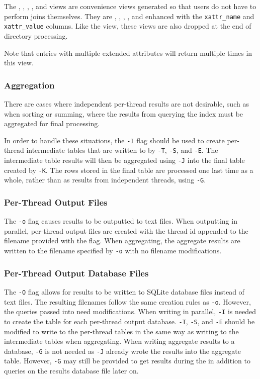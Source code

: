 The \xentries, \xpentries, \xsummary, \vrxpentries, and \vrxsummary
views are convenience views generated so that users do not have to
perform joins themselves. They are \entries, \pentries, \summary,
\vrpentries, and \vrsummary enhanced with the \texttt{xattr\_name} and
\texttt{xattr\_value} columns. Like the \xattrs view, these views are
also dropped at the end of directory processing.

Note that entries with multiple extended attributes will return
multiple times in this view.

\subsubsection{Aggregation}
There are cases where independent per-thread results are not
desirable, such as when sorting or summing, where the results from
querying the index must be aggregated for final processing.

In order to handle these situations, the \texttt{-I} flag should be
used to create per-thread intermediate tables that are written to by
\texttt{-T}, \texttt{-S}, and \texttt{-E}. The intermediate table
results will then be aggregated using \texttt{-J} into the final table
created by \texttt{-K}. The rows stored in the final table are
processed one last time as a whole, rather than as results from
independent threads, using \texttt{-G}.

\subsubsection{Per-Thread Output Files}
The \texttt{-o} flag causes results to be outputted to text
files. When outputting in parallel, per-thread output files are
created with the thread id appended to the filename provided with the
flag. When aggregating, the aggregate results are written to the
filename specified by \texttt{-o} with no filename modifications.

\subsubsection{Per-Thread Output Database Files}
The \texttt{-O} flag allows for results to be written to SQLite
database files instead of text files. The resulting filenames follow
the same creation rules as \texttt{-o}. However, the queries passed
into \gufiquery need modifications. When writing in parallel,
\texttt{-I} is needed to create the table for each per-thread output
database. \texttt{-T}, \texttt{-S}, and \texttt{-E} should be modified
to write to the per-thread tables in the same way as writing to the
intermediate tables when aggregating. When writing aggregate results
to a database, \texttt{-G} is not needed as \texttt{-J} already wrote
the results into the aggregate table. However, \texttt{-G} may still
be provided to get results during the \gufiquery in addition to
queries on the results database file later on.

